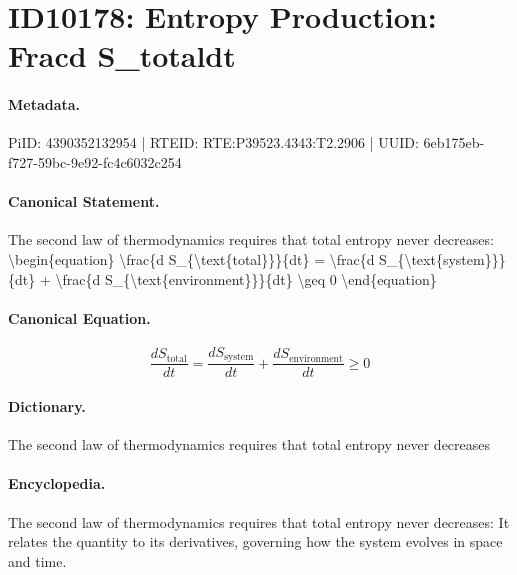\section*{ID10178: Entropy Production: Fracd S\_totaldt}
\paragraph{Metadata.}
PiID: 4390352132954 | RTEID: RTE:P39523.4343:T2.2906 | UUID: 6eb175eb-f727-59bc-9e92-fc4c6032c254

\paragraph{Canonical Statement.}
The second law of thermodynamics requires that total entropy never decreases: \textbackslash{}begin\{equation\} \textbackslash{}frac\{d S\_\{\textbackslash{}text\{total\}\}\}\{dt\} = \textbackslash{}frac\{d S\_\{\textbackslash{}text\{system\}\}\}\{dt\} + \textbackslash{}frac\{d S\_\{\textbackslash{}text\{environment\}\}\}\{dt\} \textbackslash{}geq 0 \textbackslash{}end\{equation\}

\paragraph{Canonical Equation.}
\[
\frac{d S_{\text{total}}}{dt} = \frac{d S_{\text{system}}}{dt} + \frac{d S_{\text{environment}}}{dt} \geq 0
\]

\paragraph{Dictionary.}
The second law of thermodynamics requires that total entropy never decreases

\paragraph{Encyclopedia.}
The second law of thermodynamics requires that total entropy never decreases: It relates the quantity to its derivatives, governing how the system evolves in space and time.
